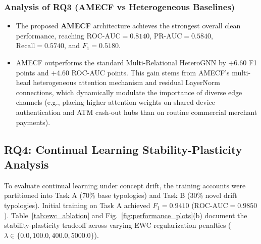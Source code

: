 \documentclass[conference]{IEEEtran}
\begin{document}
\subsubsection{Analysis of RQ3 (AMECF vs Heterogeneous Baselines)}
\begin{itemize}
    \item The proposed \textbf{AMECF} architecture achieves the strongest overall clean performance, reaching $\text{ROC-AUC} = \mathbf{0.8140}$, $\text{PR-AUC} = \mathbf{0.5840}$, $\text{Recall} = \mathbf{0.5740}$, and $F_1 = \mathbf{0.5180}$.
    \item AMECF outperforms the standard Multi-Relational HeteroGNN by $+6.60$ F1 points and $+4.60$ ROC-AUC points. This gain stems from AMECF's multi-head heterogeneous attention mechanism and residual LayerNorm connections, which dynamically modulate the importance of diverse edge channels (e.g., placing higher attention weights on shared device authentication and ATM cash-out hubs than on routine commercial merchant payments).
\end{itemize}

\subsection{RQ4: Continual Learning Stability-Plasticity Analysis}
To evaluate continual learning under concept drift, the training accounts were partitioned into Task A (70\% base typologies) and Task B (30\% novel drift typologies). Initial training on Task A achieved $F_1 = 0.9410$ ($\text{ROC-AUC} = 0.9850$). Table~\ref{tab:ewc_ablation} and Fig.~\ref{fig:performance_plots}(b) document the stability-plasticity tradeoff across varying EWC regularization penalties ($\lambda \in \{0.0, 100.0, 400.0, 5000.0\}$).

\begin{table}[t]
\centering
\caption{EWC Continual Learning Stability-Plasticity Ablation Sweep}
\label{tab:ewc_ablation}
\end{table}
\end{document}

